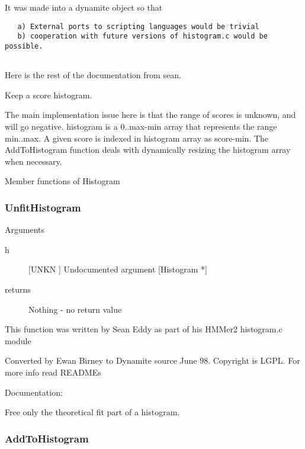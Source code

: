 It was made into a dynamite object so that
\begin{verbatim}
   a) External ports to scripting languages would be trivial
   b) cooperation with future versions of histogram.c would be possible.


\end{verbatim}
Here is the rest of the documentation from sean.


Keep a score histogram. 


The main implementation issue here is that the range of
scores is unknown, and will go negative. histogram is
a 0..max-min array that represents the range min..max.
A given score is indexed in histogram array as score-min.
The AddToHistogram function deals with dynamically 
resizing the histogram array when necessary.




Member functions of Histogram

\subsubsection{UnfitHistogram}

Arguments
\begin{description}
\item[h] [UNKN ] Undocumented argument [Histogram *]
\item[returns] Nothing - no return value
\end{description}


This function was written by Sean Eddy
as part of his HMMer2 histogram.c module


Converted by Ewan Birney to Dynamite source June 98.
Copyright is LGPL. For more info read READMEs


Documentation:


Free only the theoretical fit part of a histogram.


\subsubsection{AddToHistogram}


